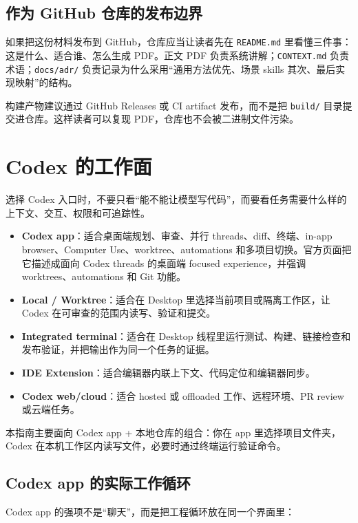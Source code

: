 \documentclass[UTF8,a4paper,11pt,fontset=none]{ctexart}
\newcommand{\file}[1]{\texttt{#1}}
\newcommand{\keypoint}[1]{\textbf{#1}}
\begin{document}
\subsection{作为 GitHub 仓库的发布边界}

如果把这份材料发布到 GitHub，仓库应当让读者先在 \file{README.md} 里看懂三件事：这是什么、适合谁、怎么生成 PDF。正文 PDF 负责系统讲解；\file{CONTEXT.md} 负责术语；\file{docs/adr/} 负责记录为什么采用“通用方法优先、场景 skills 其次、最后实现映射”的结构。

构建产物建议通过 GitHub Releases 或 CI artifact 发布，而不是把 \file{build/} 目录提交进仓库。这样读者可以复现 PDF，仓库也不会被二进制文件污染。

\section{Codex 的工作面}

选择 Codex 入口时，不要只看“能不能让模型写代码”，而要看任务需要什么样的上下文、交互、权限和可追踪性。

\begin{itemize}
  \item \keypoint{Codex app}：适合桌面端规划、审查、并行 threads、diff、终端、in-app browser、Computer Use、worktree、automations 和多项目切换。官方页面把它描述成面向 Codex threads 的桌面端 focused experience，并强调 worktrees、automations 和 Git 功能。
  \item \keypoint{Local / Worktree}：适合在 Desktop 里选择当前项目或隔离工作区，让 Codex 在可审查的范围内读写、验证和提交。
  \item \keypoint{Integrated terminal}：适合在 Desktop 线程里运行测试、构建、链接检查和发布验证，并把输出作为同一个任务的证据。
  \item \keypoint{IDE Extension}：适合编辑器内联上下文、代码定位和编辑器同步。
  \item \keypoint{Codex web/cloud}：适合 hosted 或 offloaded 工作、远程环境、PR review 或云端任务。
\end{itemize}

本指南主要面向 Codex app + 本地仓库的组合：你在 app 里选择项目文件夹，Codex 在本机工作区内读写文件，必要时通过终端运行验证命令。

\subsection{Codex app 的实际工作循环}

Codex app 的强项不是“聊天”，而是把工程循环放在同一个界面里：
\end{document}
